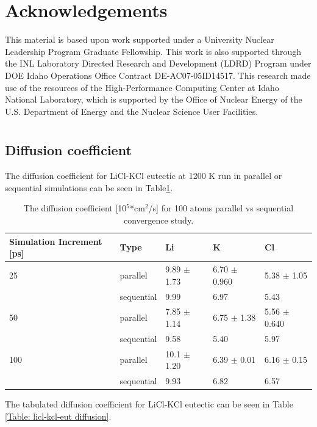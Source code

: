 \documentclass[review]{elsarticle}
\begin{document}
\section{Acknowledgements}

This material is based upon work supported under a University Nuclear Leadership Program Graduate Fellowship. This work is also supported through the INL Laboratory Directed Research and Development (LDRD) Program under DOE Idaho Operations Office Contract DE-AC07-05ID14517. This research made use of the resources of the High-Performance Computing Center at Idaho National Laboratory, which is supported by the Office of Nuclear Energy of the U.S. Department of Energy and the Nuclear Science User Facilities.  
\FloatBarrier

\appendix

\section{}
\subsection{Diffusion coefficient}
The diffusion coefficient for LiCl-KCl eutectic at 1200 K run in parallel or sequential simulations can be seen in Table\ref{Table:parVSseq}.

\begin{table}[h]
\centering
\caption{The diffusion coefficient [10$^5$*cm$^2$/s] for 100 atoms parallel vs sequential convergence study. }
\begin{tabular}{lllll}
\hline
Simulation Increment   {[}ps{]} & Type       & Li       & K        & Cl       \\
\hline
25                              & parallel   & 9.89 $\pm$ 1.73& 6.70 $\pm$ 0.960& 5.38 $\pm$ 1.05\\
& sequential & 9.99 & 6.97 & 5.43 \\
50 & parallel   & 7.85  $\pm$ 1.14& 6.75 $\pm$ 1.38& 5.56 $\pm$  0.640\\
 & sequential & 9.58 & 5.40 & 5.97 \\
100 & parallel   & 10.1  $\pm$ 1.20& 6.39 $\pm$  0.01 & 6.16 $\pm$  0.15\\
& sequential & 9.93 & 6.82 & 6.57 \\
\hline
\end{tabular}
\label{Table:parVSseq}
\end{table}
\FloatBarrier

The tabulated diffusion coefficient for LiCl-KCl eutectic can be seen in Table \ref{Table: licl-kcl-eut diffusion}.
\end{document}
